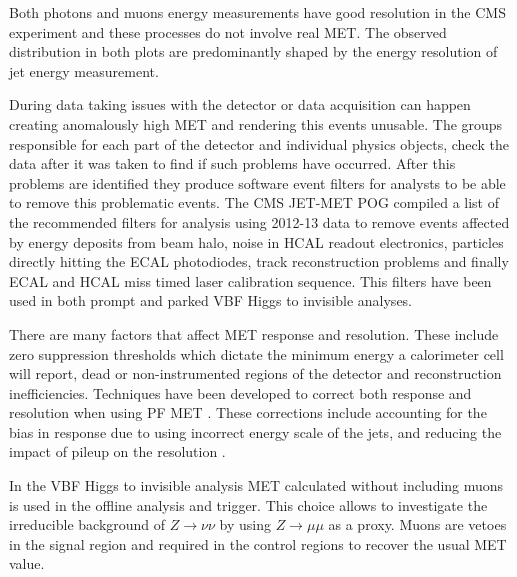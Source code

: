 Both photons and muons energy measurements have good resolution in the \gls{CMS} experiment and these processes do not involve real \gls{MET}. The observed distribution in both plots are predominantly shaped by the energy resolution of jet energy measurement.

During data taking issues with the detector or data acquisition can happen creating anomalously high \gls{MET} and rendering this events unusable. The groups responsible for each part of the detector and individual physics objects, check the data after it was taken to find if such problems have occurred. After this problems are identified they produce software event filters for analysts to be able to remove this problematic events. The \gls{CMS} JET-MET \gls{POG} compiled a list of the recommended filters for analysis using 2012-13 data to remove events affected by energy deposits from beam halo, noise in \gls{HCAL} readout electronics, particles directly hitting the \gls{ECAL} photodiodes, track reconstruction problems and finally \gls{ECAL} and \gls{HCAL} miss timed laser calibration sequence. This filters have been used in both prompt and parked \gls{VBF} Higgs to invisible analyses.

There are many factors that affect \gls{MET} response and resolution. These include zero suppression thresholds which dictate the minimum energy a calorimeter cell will report, dead or non-instrumented regions of the detector and reconstruction inefficiencies. Techniques have been developed to correct both response and resolution when using \gls{PF} \gls{MET} \cite{ARTICLE:CMSMissingTransverseEnergyPerformance}. These corrections include accounting for the bias in response due to using incorrect energy scale of the jets, and reducing the impact of pileup on the resolution \cite{ARTICLE:CMSMETPerformance8TeV}.

In the \gls{VBF} Higgs to invisible analysis \gls{MET} calculated without including muons is used in the offline analysis and trigger. This choice allows to investigate the irreducible background of $Z \rightarrow \nu\nu$ by using $Z \rightarrow \mu\mu$ as a proxy. Muons are vetoes in the signal region and required in the control regions to recover the usual \gls{MET} value.


